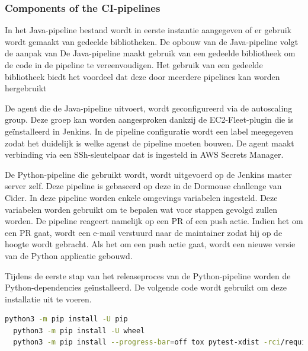 \subsubsection{
{Components of the CI-pipelines}}
\label{sec:Bouwstenen van de CI-pipelines}

In het Java-pipeline bestand wordt in eerste instantie aangegeven of er gebruik wordt gemaakt van gedeelde bibliotheken. De opbouw van de Java-pipeline volgt de aanpak van \textcite{Kumar2023} De Java-pipeline maakt gebruik van een gedeelde bibliotheek om de code in de pipeline te vereenvoudigen. Het gebruik van een gedeelde bibliotheek biedt het voordeel dat deze door meerdere pipelines kan worden hergebruikt
\newline

De agent die de Java-pipeline uitvoert, wordt geconfigureerd via de autoscaling group. Deze groep kan worden aangesproken dankzij de EC2-Fleet-plugin die is geïnstalleerd in Jenkins. In de pipeline configuratie wordt een label meegegeven zodat het duidelijk is welke agenst de pipeline moeten bouwen. De agent maakt verbinding via een SSh-sleutelpaar dat is ingesteld in AWS Secrets Manager.
\newline

De Python-pipeline die gebruikt wordt, wordt uitgevoerd op de Jenkins master server zelf. Deze pipeline is gebaseerd op deze in de Dormouse challenge van Cider. \autocite{Cider2022} In deze pipeline worden enkele omgevings variabelen ingesteld. Deze variabelen worden gebruikt om te bepalen wat voor stappen gevolgd zullen worden. De pipeline reageert namelijk op een PR of een push actie. Indien het om een PR gaat, wordt een e-mail verstuurd naar de maintainer zodat hij op de hoogte wordt gebracht. Als het om een push actie gaat, wordt een nieuwe versie van de Python applicatie gebouwd.
\newline

Tijdens de eerste stap van het releaseproces van de Python-pipeline worden de Python-dependencies geïnstalleerd. De volgende code wordt gebruikt om deze installatie uit te voeren.
\newline

\begin{lstlisting}[language=bash, style=bashstyle]
  python3 -m pip install -U pip
  python3 -m pip install -U wheel
  python3 -m pip install --progress-bar=off tox pytest-xdist -rci/requirements.txt
\end{lstlisting}

